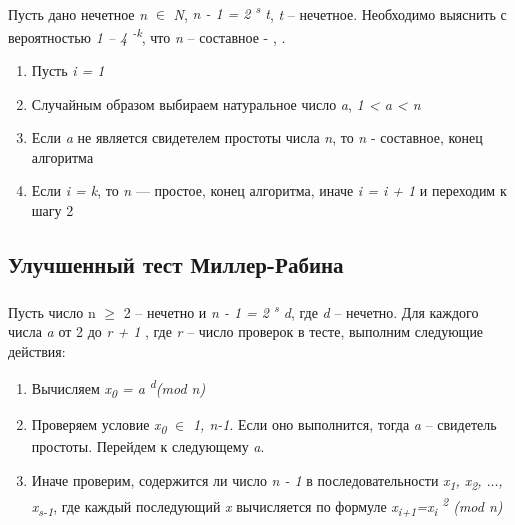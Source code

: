 \paragraph{}Пусть дано нечетное \textit{n} {$\in$} \textit{N}, \textit{n - 1 = 2\textsuperscript{ s} t}, \textit{t} – нечетное. Необходимо выяснить 
с вероятностью \textit{1 – 4\textsuperscript{ -k}}, что \textit{n} – составное - \cite[Глава 1.10, страницы 27-29]{ish11},
\cite[Глава 5.1.3, страницы 183-192]{mah06}.
  
  \begin{enumerate}
   \item Пусть \textit{i = 1}
   \item Случайным образом выбираем натуральное число \textit{a}, \textit{1 < a < n}
   \item Если \textit{a} не является свидетелем простоты числа \textit{n}, то \textit{n} - составное, конец алгоритма
   \item Если \textit{i = k}, то \textit{n} — простое, конец алгоритма, иначе \textit{i = i + 1} и переходим к шагу 2
  \end{enumerate}

\subsection{Улучшенный тест Миллер-Рабина}

\paragraph{} Пусть число n {$\ge$} 2 – нечетно и \textit{n - 1 = 2\textsuperscript{ s} d}, где \textit{d} – нечетно. Для каждого числа \textit{a}
от 2 до \textit{r + 1} , где \textit{r} – число проверок в  тесте, выполним следующие действия:

  \begin{enumerate}
   \item Вычисляем \textit{x\textsubscript{0} = a\textsuperscript{ d}(mod n)}
   \item Проверяем условие \textit{x\textsubscript{0}} {$\in$} \textit{{1, n-1}}. Если оно выполнится, тогда \textit{a} – свидетель 
простоты. Перейдем к следующему \textit{a}.
   \item Иначе проверим, содержится ли число \textit{n - 1} в последовательности 
\textit{{x\textsubscript{1}, x\textsubscript{2}, {$\dots$}, x\textsubscript{s-1}}}, где каждый последующий \textit{x} 
вычисляется по формуле \textit{x\textsubscript{i+1}=x\textsubscript{i}\textsuperscript{ 2} (mod n)}
  \end{enumerate}
  
